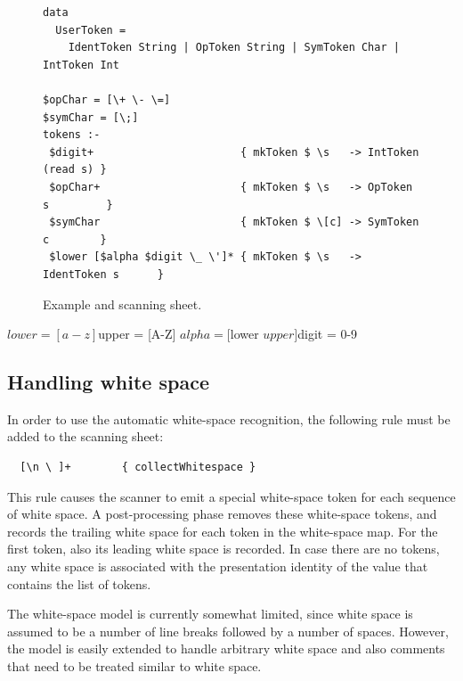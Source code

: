 \documentclass[12pt]{article}
\begin{document}
\begin{figure}
\begin{center}
\begin{footnotesize}
\begin{verbatim}
data 
  UserToken = 
    IdentToken String | OpToken String | SymToken Char | IntToken Int

$opChar = [\+ \- \=]
$symChar = [\;]
tokens :-
 $digit+                       { mkToken $ \s   -> IntToken (read s) }
 $opChar+                      { mkToken $ \s   -> OpToken s         }
 $symChar                      { mkToken $ \[c] -> SymToken c        }
 $lower [$alpha $digit \_ \']* { mkToken $ \s   -> IdentToken s      }
\end{verbatim}
\end{footnotesize}
\caption{Example  and scanning sheet.} \label{fig:scannerSheet} 
\end{center}
\end{figure}
\bc
$lower = [a-z]
$upper = [A-Z]
$alpha = [$lower $upper]
$digit = 0-9		
\ec


\subsection{Handling white space}

In order to use the automatic white-space recognition, the following rule must be added to the scanning sheet:

\begin{footnotesize}
\begin{verbatim}
  [\n \ ]+        { collectWhitespace }
\end{verbatim} 
\end{footnotesize}

This rule causes the scanner to emit a special white-space token for each sequence of white space. A post-processing phase removes these white-space tokens, and records the trailing white space for each token in the white-space map. For the first token, also its leading white space is recorded. In case there are no tokens, any white space is associated with the presentation identity of the  value that contains the list of tokens. 


The white-space model is currently somewhat limited, since white space is assumed to be a number of line breaks followed by a number of spaces. However, the model is easily extended to handle arbitrary white space and also comments that need to be treated similar to white space.
\end{document}
